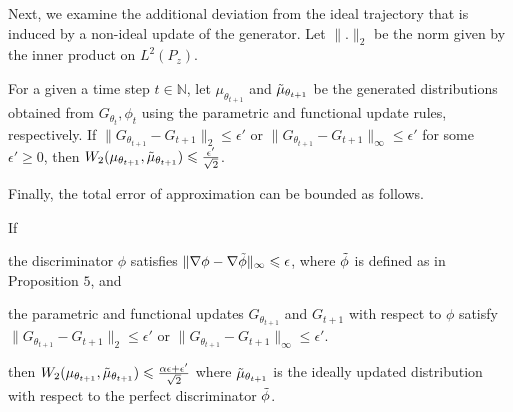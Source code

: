 \documentclass[runningheads]{llncs}
\newcommand{\id}{\mathcal{I}}
\begin{document}
Next, we examine the additional deviation from the ideal trajectory that is induced by a non-ideal update of the generator. Let $\|.\|_2$ be the norm given by the inner product on $L^2(P_z)$.
\begin{proposition}
\normalfont
\label{deviation_ideal_update}
For a given a time step $t\in \mathds{N}$, let $\mu_{\theta_{t+1}}$ and $\Tilde{\mu}_{\theta_{t+1}}$ be the generated distributions obtained from $G_{\theta_t},\phi_t$ using the parametric and functional update rules, respectively. If $\|G_{\theta_{t+1}}-G_{t+1}\|_2\leqslant \epsilon'$ or $\|G_{\theta_{t+1}}-G_{t+1}\|_\infty\leqslant \epsilon'$ for some $ \epsilon' \geqslant 0$, then $W_2(\mu_{\theta_{t+1}},\Tilde{\mu}_{\theta_{t+1}})\leqslant \frac{\epsilon'}{\sqrt{2}}$. 
\end{proposition}
Finally, the total error of approximation can be bounded as follows.
\begin{corollary}
\normalfont
\label{total deviation}
If
\begin{inlinelist}
    \item the discriminator $\phi$ satisfies $\|\nabla \phi - \nabla \Tilde{\phi}\|_{\infty}\leqslant \epsilon$, where $\Tilde{\phi}$ is defined as in Proposition $5$, and 
    \item the parametric and functional updates $G_{\theta_{t+1}}$ and $G_{t+1}$ with respect to $\phi$ satisfy $\|G_{\theta_{t+1}}-G_{t+1}\|_2\leqslant \epsilon'$ or $\|G_{\theta_{t+1}}-G_{t+1}\|_\infty\leqslant \epsilon'$. 
\end{inlinelist}
then $W_2(\mu_{\theta_{t+1}},\Tilde{\mu}_{\theta_{t+1}})\leqslant \frac{\alpha\epsilon +\epsilon'}{\sqrt{2}}$ where $\Tilde{\mu}_{\theta_{t+1}}$ is the ideally updated distribution with respect to the perfect discriminator $\Tilde{\phi}$. %
\end{corollary}
\end{document}
